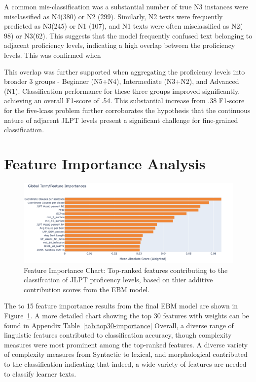 A common mis-classification was a substantial number of true N3 instances were misclassified as N4(380) or N2 (299).
Similarly, N2 texts were frequently predicted as N3(245) or N1 (107), and N1 texts were often misclassified as N2(
98) or N3(62). This suggests that the model frequently confused text belonging to adjacent proficiency levels,
indicating a high overlap between the proficiency levels. This was confirmed when

This overlap was further supported when aggregating the proficiency levels into broader 3 groups - Beginner (N5+N4),
Intermediate (N3+N2), and
Advanced (N1).
Classification performance for these three groups improved significantly, achieving an overall F1-score of .54. This
substantial increase from .38 F1-score for the five-lcass problem further corroborates the hypothesis that the
continuous nature of adjacent JLPT levels present a significant challenge for fine-grained classification.

\section{Feature Importance Analysis}
\begin{figure}[h!]
    \centering
    \includegraphics[scale=.4]{img/feature_importance}
    \caption[Feature Importance Chart]{ Feature Importance Chart: Top-ranked features contributing to the classifcation of JLPT proficency levels, based on thier additive contribution scores from the EBM model.}
    \label{fig:featureimportance}
\end{figure}


The to 15 feature importance results from the final EBM model are shown in Figure~\ref{fig:featureimportance}. A
more detailed chart showing the top 30 features with weights can be found in Appendix Table~\ref{tab:top30-importance}
Overall, a
diverse range of linguistic features contributed to classification accuracy, though complexity measures were most
prominent among the top-ranked features. A diverse variety of complexity
measures from Syntactic to lexical, and morphological contributed to the classification indicating that indeed, a
wide variety of features are needed to classify learner texts.

